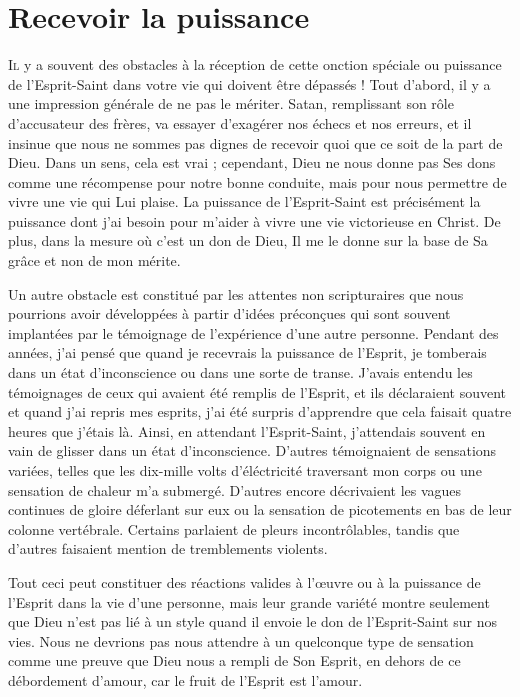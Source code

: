 \chapter{Recevoir la puissance}

\lettrine{I}{l} y a souvent des obstacles à la réception de cette onction
 spéciale ou puissance de l'Esprit-Saint dans votre vie qui doivent
 être dépassés ! Tout d'abord, il y a une impression générale
 de ne pas le mériter. Satan,  remplissant son rôle d'accusateur
 des frères, va essayer d'exagérer nos échecs et nos erreurs,
 et il insinue que nous ne sommes pas dignes de recevoir quoi que ce soit
 de la part de Dieu. Dans un sens, cela est vrai ;
 cependant, Dieu ne nous donne pas Ses dons comme une récompense
 pour notre bonne conduite, mais pour nous permettre de vivre une vie
 qui Lui plaise. La puissance de l'Esprit-Saint est précisément
 la puissance dont j'ai besoin pour m'aider à vivre une vie victorieuse
 en Christ. De plus, dans la mesure où c'est un don de Dieu,
 Il me le donne sur la base de Sa grâce et non de mon mérite.

Un autre obstacle est constitué par les attentes non scripturaires
 que nous pourrions avoir développées à partir d'idées préconçues
 qui sont souvent implantées par le témoignage de l'expérience 
 d'une autre personne. Pendant des années, j'ai pensé que
 quand je recevrais la puissance de l'Esprit, je tomberais dans un état
 d'inconscience ou dans une sorte de transe.
 J'avais entendu les témoignages de ceux qui avaient été remplis de l'Esprit,
 et ils déclaraient souvent\frcolon{} \Og [\dots{}] et quand j'ai repris mes esprits,
 j'ai été surpris d'apprendre que cela faisait quatre heures
 que j'étais là. \Fg{}
 Ainsi, en attendant l'Esprit-Saint, j'attendais souvent en vain
 de glisser dans un état d'inconscience.
 D'autres témoignaient de sensations variées, telles que
 \Og les dix-mille volts d'éléctricité traversant mon corps \Fg{} ou
 \Og une sensation de chaleur m'a submergé. \Fg{}
 D'autres encore décrivaient les vagues continues de gloire déferlant
 sur eux ou la sensation de picotements en bas de leur colonne vertébrale.
 Certains parlaient de pleurs incontrôlables,
 tandis que d'autres faisaient mention de tremblements violents.

Tout ceci peut constituer des réactions valides à l'œuvre
 ou à la puissance de l'Esprit dans la vie d'une personne,
 mais leur grande variété montre seulement que Dieu n'est pas lié
 à un style quand il envoie le don de l'Esprit-Saint sur nos vies.
 Nous ne devrions pas nous attendre à un quelconque type de sensation
 comme une preuve que Dieu nous a rempli de Son Esprit,
 en dehors de ce débordement d'amour, car le fruit de l'Esprit est l'amour.

